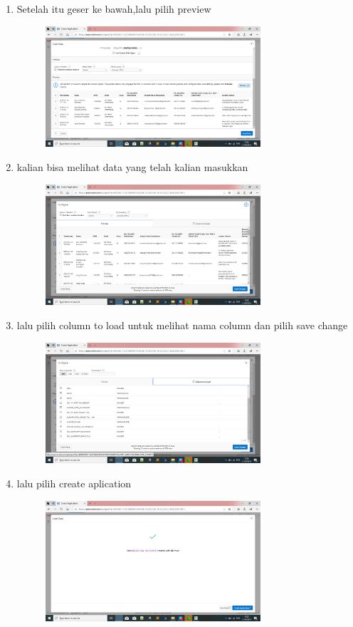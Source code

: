 \documentclass{article}
\begin{document}
\begin{enumerate}
\begin{figure}[h]
 \end{figure}
\item Setelah itu geser ke bawah,lalu pilih preview
    \begin{figure}[h]
   \centerline{\includegraphics[width=8cm]{figure/le.png}}
\end{figure}
\newpage\item kalian bisa melihat data yang telah kalian masukkan
    \begin{figure}[h]
   \centerline{\includegraphics[width=8cm]{figure/se.png}}
\end{figure}
\item lalu pilih column to load untuk melihat nama column dan pilih save change
    \begin{figure}[h]
   \centerline{\includegraphics[width=8cm]{figure/de.png}}
\end{figure}
\newpage\item lalu pilih create aplication
    \begin{figure}[h]
   \centerline{\includegraphics[width=8cm]{figure/di.png}}

\end{figure}
\end{enumerate}
\end{document}
